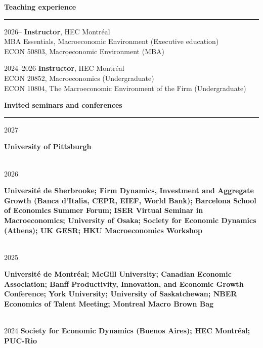 \documentclass[12pt]{article}
\begin{document}
\vspace{0.5cm}

{\large \textbf{Teaching experience}} \\
\noindent\rule[0.5\baselineskip]{\textwidth}{1pt}

\begin{small}
2026-- \tabto{3cm} \textbf{Instructor}, HEC Montr\'eal \\
\tabto{3cm} \hspace{0.25cm} MBA Essentials, Macroeconomic Environment (Executive education) \\
\tabto{3cm} \hspace{0.25cm} ECON 50803, Macroeconomic Environment (MBA)
\end{small}

\begin{small}
2024--2026 \tabto{3cm} \textbf{Instructor}, HEC Montr\'eal \\
\tabto{3cm} \hspace{0.25cm} ECON 20852, Macroeconomics (Undergraduate) \\
\tabto{3cm} \hspace{0.25cm} ECON 10804, The Macroeconomic Environment of the Firm (Undergraduate)
\end{small}

\vspace{0.5cm}

{\large \textbf{Invited seminars and conferences}} \\
\noindent\rule[0.5\baselineskip]{\textwidth}{1pt}

\begin{small}

2027 \tabto{3cm} \parbox[t]{13cm}{\textbf{University of Pittsburgh}} \\

2026 \tabto{3cm} \parbox[t]{13cm}{\textbf{Université de Sherbrooke; Firm Dynamics, Investment and Aggregate Growth (Banca d'Italia, CEPR, EIEF, World Bank); Barcelona School of Economics Summer Forum; ISER Virtual Seminar in Macroeconomics; University of Osaka; Society for Economic
Dynamics (Athens); UK GESR; HKU Macroeconomics Workshop}} \\

2025 \tabto{3cm} \parbox[t]{13cm}{\textbf{Université de Montréal; McGill University; Canadian Economic Association; Banff Productivity, Innovation, and Economic Growth Conference; York University; University of Saskatchewan; NBER Economics of Talent Meeting; Montreal Macro Brown Bag}} \\

2024 \tabto{3cm} \textbf{Society for Economic
Dynamics (Buenos Aires); HEC Montr\'eal; PUC-Rio}

\end{small}
\end{document}
